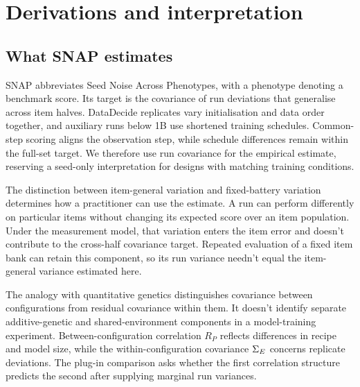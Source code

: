 \section{Derivations and interpretation}
\subsection{What SNAP estimates}
SNAP abbreviates Seed Noise Across Phenotypes, with a phenotype denoting a benchmark score. Its target is the covariance of run deviations that generalise across item halves. DataDecide replicates vary initialisation and data order together, and auxiliary runs below 1B use shortened training schedules. Common-step scoring aligns the observation step, while schedule differences remain within the full-set target. We therefore use run covariance for the empirical estimate, reserving a seed-only interpretation for designs with matching training conditions.

The distinction between item-general variation and fixed-battery variation determines how a practitioner can use the estimate. A run can perform differently on particular items without changing its expected score over an item population. Under the measurement model, that variation enters the item error and doesn't contribute to the cross-half covariance target. Repeated evaluation of a fixed item bank can retain this component, so its run variance needn't equal the item-general variance estimated here.

The analogy with quantitative genetics distinguishes covariance between configurations from residual covariance within them. It doesn't identify separate additive-genetic and shared-environment components in a model-training experiment. Between-configuration correlation $R_P$ reflects differences in recipe and model size, while the within-configuration covariance $\Sigma_E$ concerns replicate deviations. The plug-in comparison asks whether the first correlation structure predicts the second after supplying marginal run variances.

